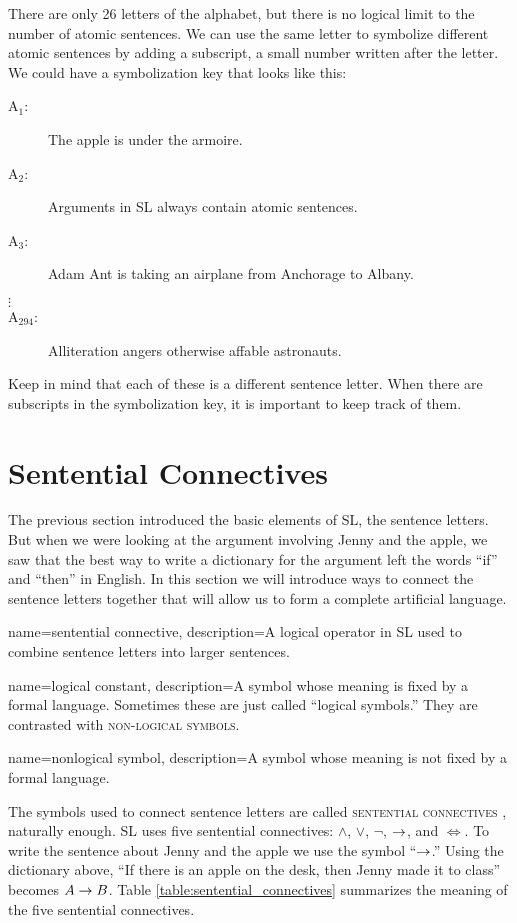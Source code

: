 There are only 26 letters of the alphabet, but there is no logical limit to the number of atomic sentences. We can use the same letter to symbolize different atomic sentences by adding a subscript, a small number written after the letter. We could have a symbolization key that looks like this:

\begin{description}
\item[A$_1$:] The apple is under the armoire.
\item[A$_2$:] Arguments in SL always contain atomic sentences.
\item[A$_3$:] Adam Ant is taking an airplane from Anchorage to Albany.
\item[$\vdots$]
\item[A$_{294}$:] Alliteration angers otherwise affable astronauts.
\end{description}

Keep in mind that each of these is a different sentence letter. When there are subscripts in the symbolization key, it is important to keep track of them.

\section{Sentential Connectives}

The previous section introduced the basic elements of SL, the sentence letters. But when we were looking at the argument involving Jenny and the apple, we saw that the best way to write a dictionary for the argument left the words ``if'' and ``then'' in English. In this section we will introduce ways to connect the sentence letters together that will allow us to form a complete artificial language.

{
name=sentential connective,
description={A logical operator in SL used to combine sentence letters into larger sentences.}
}

{
name=logical constant,
description={A symbol whose meaning is fixed by a formal language. Sometimes these are just called ``logical symbols.'' They are contrasted with \textsc{non-logical symbols}.}
}

{
name=nonlogical symbol,
description={A symbol whose meaning is not fixed by a formal language.}
}

The symbols used to connect sentence letters are called \textsc{\glspl{sentential connective}} \label{def:sentential_connective}, naturally enough. SL uses five sentential connectives: $\land$, $\lor$, $\lnot$, $\mathrel{\rightarrow}$, and $\iff$. To write the sentence about Jenny and the apple we use the symbol ``$\mathrel{\rightarrow}$.'' Using the dictionary above, ``If there is an apple on the desk, then Jenny made it to class'' becomes $A \mathrel{\rightarrow} B$. Table \ref{table:sentential_connectives} summarizes the meaning of the five sentential connectives.


